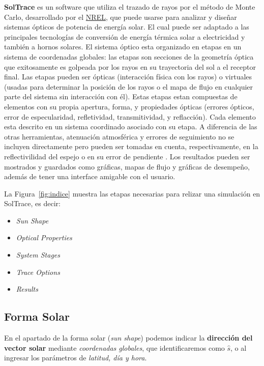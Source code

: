 \documentclass[12pt, spanish]{article}
\theoremstyle{problemstyle}
\begin{document}
\textbf{SolTrace} es un software que utiliza el trazado de rayos por el método de Monte Carlo, desarrollado por el \href{https://www.nrel.gov/csp/soltrace.html}{NREL}, que puede usarse para analizar y diseñar sistemas ópticos de potencia de energía solar. El cual puede ser adaptado a las principales tecnologías de conversión de energía térmica solar a electricidad y también a hornos solares. El sistema óptico esta organizado en etapas en un sistema de coordenadas globales: las etapas son secciones de la geometría óptica que exitosamente es golpeada por los rayos en su trayectoria del sol a el receptor final. Las etapas pueden ser ópticas (interacción física con los rayos) o virtuales (usadas para determinar la posición de los rayos o el mapa de flujo en cualquier parte del sistema sin interacción con él). Estas etapas estan compuestas de elementos con su propia apertura, forma, y propiedades ópticas (errores ópticos, error de especularidad, refletividad, transmitividad, y reflacción). Cada elemento esta descrito en un sistema coordinado asociado con su etapa. A diferencia de las otras herramientas, atenuación atmosférica y errores de seguimiento no se incluyen directamente pero pueden ser tomadas en cuenta, respectivamente, en la reflectivilidad del espejo o en su error de pendiente \citep{Wendelin2013soltrace}. Los resultados pueden ser mostrados y guardados como gráficas, mapas de flujo y gráficas de desempeño, además de tener una interface amigable con el usuario.


La Figura~\ref{fig:indice} muestra las etapas necesarias para relizar una simulación en SolTrace, es decir:

\begin{itemize}[noitemsep]
\item \emph{Sun Shape}
\item \emph{Optical Properties}
\item \emph{System Stages}
\item \emph{Trace Options}
\item \emph{Results}
\end{itemize}

\subsection{Forma Solar}
\label{subsec:forma}

En el apartado de la forma solar (\emph{sun shape}) podemos indicar la \textbf{dirección del vector solar} mediante \emph{coordenadas globales}, que identificaremos como $\hat s$, o al ingresar los parámetros de \emph{latitud, día y hora}.
\end{document}
